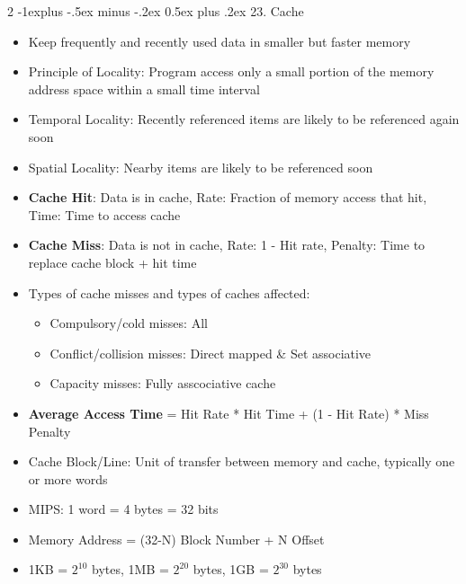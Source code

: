 \documentclass[10pt, portrait]{article}
\makeatletter
\renewcommand{\section}{\@startsection{section}{1}{0mm}%
                                {-1ex plus -.5ex minus -.2ex}%
                                {0.5ex plus .2ex}%
                                {\normalfont\large\bfseries}}
\renewcommand{\section}{\@startsection{section}{2}{0mm}%
                                {-1explus -.5ex minus -.2ex}%
                                {0.5ex plus .2ex}%
                                {\normalfont\normalsize\bfseries}}
\renewcommand{\bf}[1]{\textbf{#1}}
\makeatother
\begin{document}
\begin{multicols*}{2}
\section{23. Cache}
\begin{itemize}
    \item Keep frequently and recently used data in smaller but faster memory
    \item Principle of Locality: Program access only a small portion of the memory address space within a small time interval
    \item Temporal Locality: Recently referenced items are likely to be referenced again soon
    \item Spatial Locality: Nearby items are likely to be referenced soon
    \item \bf{Cache Hit}: Data is in cache, Rate: Fraction of memory access that hit, Time: Time to access cache
    \item \bf{Cache Miss}: Data is not in cache, Rate: 1 - Hit rate, Penalty: Time to replace cache block + hit time
    \item Types of cache misses and types of caches affected:
    \begin{itemize}
        \item Compulsory/cold misses: All
        \item Conflict/collision misses: Direct mapped \& Set associative
        \item Capacity misses: Fully asscociative cache
    \end{itemize}
    \item \bf{Average Access Time} = Hit Rate * Hit Time + (1 - Hit Rate) * Miss Penalty
    \item Cache Block/Line: Unit of transfer between memory and cache, typically one or more words
    \item MIPS: 1 word = 4 bytes = 32 bits
    \item Memory Address = (32-N) Block Number + N Offset
    \item 1KB = $2^{10}$ bytes, 1MB = $2^{20}$ bytes, 1GB = $2^{30}$ bytes
\end{itemize}


\end{multicols*}
\end{document}

